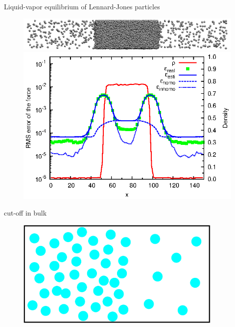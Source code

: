 \documentclass{beamer}
\begin{document}
\begin{frame}{Liquid-vapor equilibrium of Lennard-Jones particles}
  \begin{figure}
    \centering
    \includegraphics[scale=1]{figs/t0.85-n16000-rc07.5uni/confout-02.eps}\\
    \includegraphics[]{figs/t0.85-n16000-rc07.5uni/error-uniform.eps}
  \end{figure}
\end{frame}

\begin{frame}{cut-off in bulk}
  \begin{figure}
    \centering
    \includegraphics[width=0.9\textwidth]{figs/t0.85-n16000-rc07.5uni/cut-bulk-step00.eps}
  \end{figure}  
\end{frame}
\end{document}
